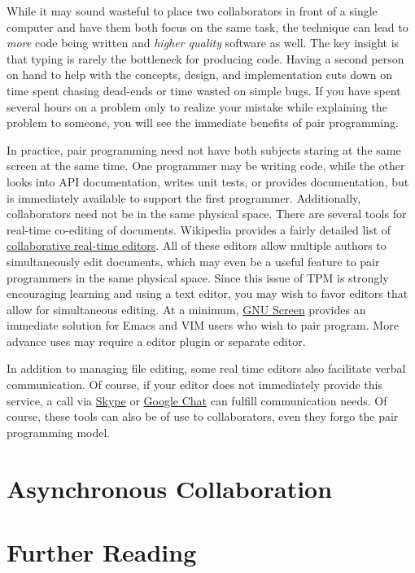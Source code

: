 \documentclass[]{article}
\begin{document}
While it may sound wasteful to place two collaborators in front of a single
computer and have them both focus on the same task, the technique can lead to
\emph{more} code being written and \emph{higher quality} software as well. The
key insight is that typing is rarely the bottleneck for producing code. Having
a second person on hand to help with the concepts, design, and implementation
cuts down on time spent chasing dead-ends or time wasted on simple bugs.
If you have spent several hours on a problem only to realize your mistake
while explaining the problem to someone, you will see the immediate benefits
of pair programming. 

In practice, pair programming need not have both subjects staring at the same
screen at the same time. One programmer may be writing code, while the other
looks into API documentation, writes unit tests, or provides documentation,
but is immediately available to support the first programmer. Additionally,
collaborators need not be in the same physical space. There are several tools
for real-time co-editing of documents. Wikipedia provides a fairly detailed
list of \href{http://en.wikipedia.org/wiki/Collaborative_real-time_editor}{collaborative real-time
editors}. All of these editors allow multiple authors to simultaneously edit
documents, which may even be a useful feature to pair programmers in the same
physical space. Since this issue of TPM is strongly encouraging learning and
using a text editor, you may wish to favor editors that allow for simultaneous
editing. At a minimum, \href{http://www.gnu.org/software/screen/}{GNU Screen}
provides an immediate solution for Emacs and VIM users who wish to pair program.
More advance uses may require a editor plugin or separate editor.

In addition to managing file editing, some real time editors also facilitate
verbal communication. Of course, if your editor does not immediately provide
this service, a call via \href{http://www.skype.com}{Skype} or
\href{http://chat.google.com}{Google Chat} can fulfill communication needs. Of
course, these tools can also be of use to collaborators, even they forgo the
pair programming model.

\section{Asynchronous Collaboration}

\section{Further Reading}

\end{document}
